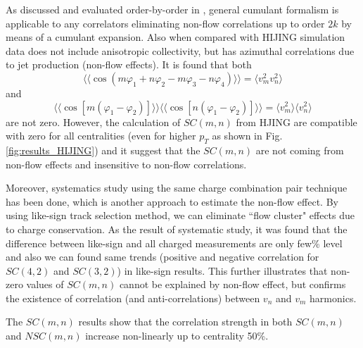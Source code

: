 As discussed and evaluated order-by-order in \cite{Gyulassy:1994ew}, general cumulant formalism is applicable to any correlators eliminating non-flow correlations up to order $2k$ by means of a cumulant expansion. Also when compared with HIJING simulation data\cite{PhysRevD.44.3501} does not include anisotropic collectivity, but has azimuthal correlations due to jet production (non-flow effects)\cite{Borghini:2000sa}.  It is found that both $$\langle \langle \cos{(m\varphi_1 + n\varphi_2 - m\varphi_3 - n\varphi_4)} \rangle \rangle = \langle v_m^2 v_n^2 \rangle $$ and  $$\langle \langle  \cos[m(\varphi_1 - \varphi_2)] \rangle \rangle \langle \langle  \cos[n(\varphi_1 - \varphi_2)] \rangle \rangle = \langle v_m^2 \rangle \langle v_n^2 \rangle$$ are not zero. However, the calculation of $SC(m,n)$ from HJING are compatible with zero for all centralities (even for higher $p_T$ as shown in Fig.\ref{fig:results_HIJING}) and it suggest that the $SC(m,n)$ are not coming from non-flow effects and insensitive to non-flow correlations.

Moreover, systematics study using the same charge combination pair technique has been done, which is another approach to estimate the non-flow effect. By using like-sign track selection method, we can eliminate ``flow cluster" effects due to charge conservation. As the result of systematic study, it was found that the difference between like-sign and all charged measurements are only few\% level and also we can found same trends (positive and negative correlation for $SC(4,2)$ and $SC(3,2)$) in like-sign results. This further illustrates that non-zero values of $SC(m,n)$ cannot be explained by non-flow effect, but confirms the existence of correlation (and anti-correlations) between $v_n$ and $v_m$ harmonics.

The $SC(m,n)$ results show that the correlation strength in both $SC(m,n)$ and $NSC(m,n)$ increase non-linearly up to centrality 50\%. 

